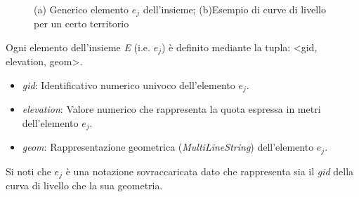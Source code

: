 \begin{enumerate}
\begin{figure}[bth]
\myfloatalign
{} \quad
{} \\
\label{fig:example}
\caption{(a) Generico elemento $e_j$ dell'insieme; (b)Esempio di curve di livello per un certo territorio }
\end{figure}


Ogni elemento dell'insieme \textit{E} (i.e. $e_j$) è definito mediante la tupla: <gid, elevation, geom>.
\begin{itemize}
\item \textit{gid}: Identificativo numerico univoco dell'elemento $e_j$.
\item \textit{elevation}: Valore numerico che rappresenta la quota espressa in metri dell'elemento $e_j$.
\item \textit{geom}: Rappresentazione geometrica (\textit{MultiLineString}) dell'elemento $e_j$.
\end{itemize}
Si noti che $e_j$ è una notazione sovraccaricata dato che rappresenta sia il \textit{gid} della curva di livello che la sua geometria.


\end{enumerate}
